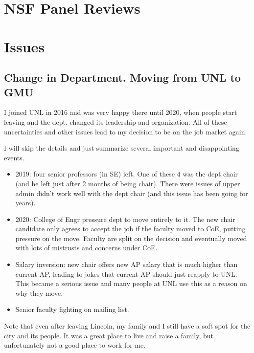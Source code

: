 \documentclass[oneside,11pt,dvipsnames]{book}
\newenvironment{commentbox}[1][]{
  \small
  \begin{mybox}
    {\small \textbf{#1}}
  }{
  \end{mybox}
}
\begin{document}


\appendix
\chapter{NSF Panel Reviews}
\chapter{Issues}


\section{Change in Department. Moving from UNL to GMU}

I joined UNL in 2016 and was very happy there until 2020, when people start leaving and the dept. changed its leadership and organization.  All of these uncertainties and other issues lead to my decision to be on the job market again.  

I will skip the details and just summarize several important and disappointing events.

\begin{itemize}
\item 2019: four senior professors (in SE) left.  One of these 4 was the dept chair (and he left just after 2 months of being chair). There were issues of upper admin didn't work well with the dept chair (and this issue has been going for years).
\item 2020: College of Engr pressure dept to move entirely to it. The new chair candidate only agrees to accept the job if the faculty moved to CoE, putting pressure on the move. Faculty are split on the decision and eventually moved with lots of mistrusts and concerns under CoE.
\item Salary inversion:  new chair offers new AP salary that is much higher than current AP, leading to jokes that current AP should just reapply to UNL.  This became a serious issue and many people at UNL use this as a reason on why they move. 
\item Senior faculty fighting on mailing list. 

\end{itemize}


Note that even after leaving Lincoln, my family and I still have a soft spot for the city and its people.  It was a great place to live and raise a family, but unfortunately not a good place to work for me. 



\end{document}
